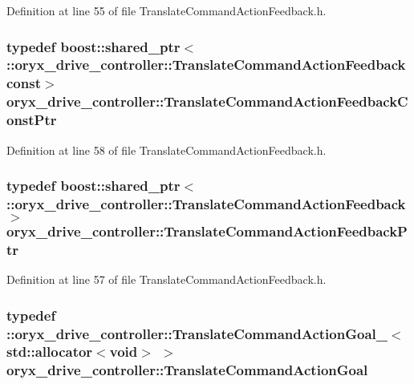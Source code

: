 \-Definition at line 55 of file \-Translate\-Command\-Action\-Feedback.\-h.

\subsubsection[{\-Translate\-Command\-Action\-Feedback\-Const\-Ptr}]{\setlength{\rightskip}{0pt plus 5cm}typedef boost\-::shared\-\_\-ptr$<$ \-::{\bf oryx\-\_\-drive\-\_\-controller\-::\-Translate\-Command\-Action\-Feedback} const$>$ {\bf oryx\-\_\-drive\-\_\-controller\-::\-Translate\-Command\-Action\-Feedback\-Const\-Ptr}}\label{namespaceoryx__drive__controller_af969569c68d1fcd5e51c1debc5f06bf0}


\-Definition at line 58 of file \-Translate\-Command\-Action\-Feedback.\-h.

\subsubsection[{\-Translate\-Command\-Action\-Feedback\-Ptr}]{\setlength{\rightskip}{0pt plus 5cm}typedef boost\-::shared\-\_\-ptr$<$ \-::{\bf oryx\-\_\-drive\-\_\-controller\-::\-Translate\-Command\-Action\-Feedback}$>$ {\bf oryx\-\_\-drive\-\_\-controller\-::\-Translate\-Command\-Action\-Feedback\-Ptr}}\label{namespaceoryx__drive__controller_a4bf24c560219ccdfe4e45cc60ad3aba2}


\-Definition at line 57 of file \-Translate\-Command\-Action\-Feedback.\-h.

\subsubsection[{\-Translate\-Command\-Action\-Goal}]{\setlength{\rightskip}{0pt plus 5cm}typedef \-::{\bf oryx\-\_\-drive\-\_\-controller\-::\-Translate\-Command\-Action\-Goal\-\_\-}$<$std\-::allocator$<$void$>$ $>$ {\bf oryx\-\_\-drive\-\_\-controller\-::\-Translate\-Command\-Action\-Goal}}\label{namespaceoryx__drive__controller_a9d2dcf7c126b4c56954696c11e06bb97}


